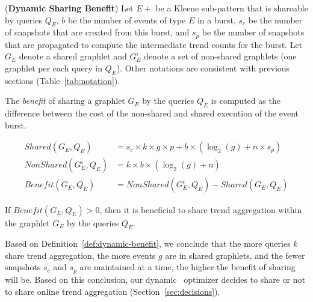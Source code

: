\begin{definition}(\textbf{Dynamic Sharing Benefit})
%
Let $E+$ be a Kleene sub-pattern that is shareable by queries $Q_E$,
$b$ be the number of events of type $E$ in a burst,
$s_c$ be the number of snapshots that are created from this burst, and
$s_p$ be the number of snapshots that are propagated to compute the intermediate trend counts for the burst. 
Let $G_E$ denote a shared graphlet and $G_E^i$ denote a set of non-shared graphlets (one graphlet per each query in $Q_E$).
Other notations are consistent with previous sections (Table~\ref{tab:notation}).

The \textit{benefit} of sharing a graphlet $G_E$ by the queries $Q_E$ is computed as the difference between the cost of the non-shared and shared execution of the event burst.

\vspace{-3mm}
\begin{align}
\mathit{Shared}(G_E,Q_E) 
&= s_c \times k \times g \times p 
+ b \times (\log_2(g) + n \times s_p) \nonumber\\
\mathit{NonShared}(G_E^i,Q_E) 
&= k \times b \times (\log_2(g) + n) \nonumber\\
\mathit{Benefit}(G_E,Q_E) 
&= \mathit{NonShared}(G_E^i,Q_E)
- \mathit{Shared}(G_E,Q_E)
\label{eq:dynamic-benefit}
\end{align}

If $\mathit{Benefit}(G_E,Q_E)>0$, then it is beneficial to share trend aggregation within the graphlet $G_E$ by the queries $Q_E$.
%
\label{def:dynamic-benefit}
\end{definition}

Based on Definition~\ref{def:dynamic-benefit}, we conclude that the more queries $k$ share trend aggregation, the more events $g$ are in shared graphlets, and the fewer snapshots $s_c$ and $s_p$ are maintained at a time, the higher the benefit of sharing will be. Based on this conclusion, our dynamic \app\ optimizer decides to share or not to share online trend aggregation (Section~\ref{sec:decisions}).




